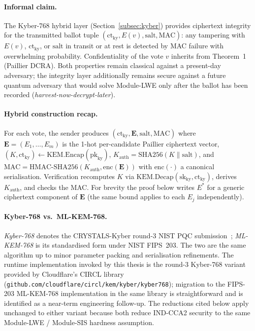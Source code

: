 \paragraph{Informal claim.} The Kyber-768 hybrid layer (Section~\ref{subsec:kyber}) provides ciphertext integrity for the transmitted ballot tuple $(\text{ct}_{\text{ky}}, E(v), \text{salt}, \text{MAC})$: any tampering with $E(v)$, $\text{ct}_{\text{ky}}$, or $\text{salt}$ in transit or at rest is detected by MAC failure with overwhelming probability. Confidentiality of the vote $v$ inherits from Theorem~1 (Paillier DCRA). Both properties remain classical against a present-day adversary; the integrity layer additionally remains secure against a future quantum adversary that would solve Module-LWE only after the ballot has been recorded (\emph{harvest-now-decrypt-later}).

\paragraph{Hybrid construction recap.} For each vote, the sender produces $(\text{ct}_{\text{ky}}, \mathbf{E}, \text{salt}, \text{MAC})$ where $\mathbf{E} = (E_1, \ldots, E_m)$ is the 1-hot per-candidate Paillier ciphertext vector, $(K, \text{ct}_{\text{ky}}) \leftarrow \mathrm{KEM}.\mathrm{Encap}(\mathrm{pk}_{\text{ky}})$, $K_{\text{auth}} = \mathrm{SHA256}(K \| \text{salt})$, and $\text{MAC} = \mathrm{HMAC\text{-}SHA256}(K_{\text{auth}}, \mathrm{enc}(\mathbf{E}))$ with $\mathrm{enc}(\cdot)$ a canonical serialisation. Verification recomputes $K$ via $\mathrm{KEM}.\mathrm{Decap}(\mathrm{sk}_{\text{ky}}, \text{ct}_{\text{ky}})$, derives $K_{\text{auth}}$, and checks the MAC. For brevity the proof below writes $E^*$ for a generic ciphertext component of $\mathbf{E}$ (the same bound applies to each $E_j$ independently).

\paragraph{Kyber-768 vs.\ ML-KEM-768.} \emph{Kyber-768} denotes the CRYSTALS-Kyber round-3 NIST PQC submission~\cite{nist_kyber}; \emph{ML-KEM-768} is its standardised form under NIST FIPS~203. The two are the same algorithm up to minor parameter packing and serialisation refinements. The runtime implementation invoked by this thesis is the round-3 Kyber-768 variant provided by Cloudflare's CIRCL library (\texttt{github.com/cloudflare/circl/kem/kyber/kyber768}); migration to the FIPS-203 ML-KEM-768 implementation in the same library is straightforward and is identified as a near-term engineering follow-up. The reductions cited below apply unchanged to either variant because both reduce IND-CCA2 security to the same Module-LWE / Module-SIS hardness assumption.


